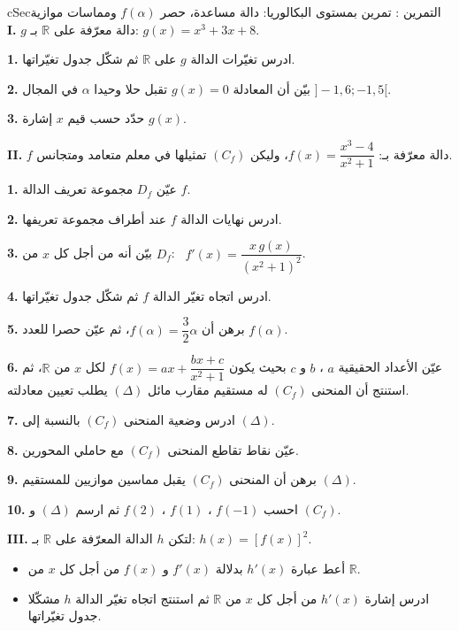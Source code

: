 \documentclass[12pt,a4paper]{article}
\newenvironment{BOX}[2]{\begin{otherlanguage}{english}\begin{arbox}{#1}{#2}}{\end{arbox}\end{otherlanguage}}
\newcounter{exo}
\newenvironment{tamrin}[1]{\stepcounter{exo}\begin{BOX}{cSec}{التمرين \theexo: #1}}{\end{BOX}}
\newcommand{\R}{\mathbb{R}}
\newcommand{\QQ}[1]{\par\smallskip\textbf{#1.} }
\begin{document}
\begin{tamrin}{تمرين بمستوى البكالوريا: دالة مساعدة، حصر $f(\alpha)$ ومماسات موازية}
\textbf{I.} $g$ دالة معرّفة على $\R$ بـ: $g(x)=x^{3}+3x+8$.
\QQ{1} ادرس تغيّرات الدالة $g$ على $\R$ ثم شكّل جدول تغيّراتها.
\QQ{2} بيّن أن المعادلة $g(x)=0$ تقبل حلا وحيدا $\alpha$ في المجال $]-1{,}6;-1{,}5[$.
\QQ{3} حدّد حسب قيم $x$ إشارة $g(x)$.

\textbf{II.} $f$ دالة معرّفة بـ: $f(x)=\dfrac{x^{3}-4}{x^{2}+1}$، وليكن $(C_f)$ تمثيلها في معلم متعامد ومتجانس.
\QQ{1} عيّن $D_f$ مجموعة تعريف الدالة $f$.
\QQ{2} ادرس نهايات الدالة $f$ عند أطراف مجموعة تعريفها.
\QQ{3} بيّن أنه من أجل كل $x$ من $D_f$: \ $f'(x)=\dfrac{x\,g(x)}{(x^{2}+1)^{2}}$.
\QQ{4} ادرس اتجاه تغيّر الدالة $f$ ثم شكّل جدول تغيّراتها.
\QQ{5} برهن أن $f(\alpha)=\dfrac32\alpha$، ثم عيّن حصرا للعدد $f(\alpha)$.
\QQ{6} عيّن الأعداد الحقيقية $a$ ، $b$ و $c$ بحيث يكون $f(x)=ax+\dfrac{bx+c}{x^{2}+1}$ لكل $x$ من $\R$، ثم استنتج أن المنحنى $(C_f)$ له مستقيم مقارب مائل $(\Delta)$ يطلب تعيين معادلته.
\QQ{7} ادرس وضعية المنحنى $(C_f)$ بالنسبة إلى $(\Delta)$.
\QQ{8} عيّن نقاط تقاطع المنحنى $(C_f)$ مع حاملي المحورين.
\QQ{9} برهن أن المنحنى $(C_f)$ يقبل مماسين موازيين للمستقيم $(\Delta)$.
\QQ{10} احسب $f(-1)$ ، $f(1)$ ، $f(2)$ ثم ارسم $(\Delta)$ و $(C_f)$.

\textbf{III.} لتكن $h$ الدالة المعرّفة على $\R$ بـ: $h(x)=\left[f(x)\right]^{2}$.
\begin{itemize}[label=$\spadesuit$]
\item أعط عبارة $h'(x)$ بدلالة $f'(x)$ و $f(x)$ من أجل كل $x$ من $\R$.
\item ادرس إشارة $h'(x)$ من أجل كل $x$ من $\R$ ثم استنتج اتجاه تغيّر الدالة $h$ مشكّلا جدول تغيّراتها.
\end{itemize}
\end{tamrin}
\end{document}

